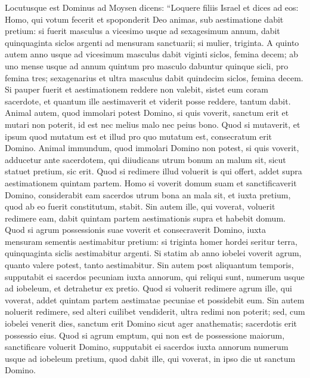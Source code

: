 \begin{biblechapter}  
\verse Locutusque est Dominus ad Moysen dicens: 
\verse “Loquere filiis Israel et dices ad eos: Homo, qui votum fecerit et spoponderit Deo animas, sub aestimatione dabit pretium: 
\verse si fuerit masculus a vicesimo usque ad sexagesimum annum, dabit quinquaginta siclos argenti ad mensuram sanctuarii;  
\verse si mulier, triginta. 
\verse A quinto autem anno usque ad vicesimum masculus dabit viginti siclos, femina decem; 
\verse ab uno mense usque ad annum quintum pro masculo dabuntur quinque sicli, pro femina tres; 
\verse sexagenarius et ultra masculus dabit quindecim siclos, femina decem. 
\verse Si pauper fuerit et aestimationem reddere non valebit, sistet eum coram sacerdote, et quantum ille aestimaverit et viderit posse reddere, tantum dabit. 
\verse Animal autem, quod immolari potest Domino, si quis voverit, sanctum erit  
\verse et mutari non poterit, id est nec melius malo nec peius bono. Quod si mutaverit, et ipsum quod mutatum est et illud pro quo mutatum est, consecratum erit Domino. 
\verse Animal immundum, quod immolari Domino non potest, si quis voverit, adducetur ante sacerdotem, 
\verse qui diiudicans utrum bonum an malum sit, sicut statuet pretium, sic erit. 
\verse Quod si redimere illud voluerit is qui offert, addet supra aestimationem quintam partem. 
\verse Homo si voverit domum suam et sanctificaverit Domino, considerabit eam sacerdos utrum bona an mala sit, et iuxta pretium, quod ab eo fuerit constitutum, stabit. 
\verse Sin autem ille, qui voverat, voluerit redimere eam, dabit quintam partem aestimationis supra et habebit domum. 
\verse Quod si agrum possessionis suae voverit et consecraverit Domino, iuxta mensuram sementis aestimabitur pretium: si triginta homer hordei seritur terra, quinquaginta siclis aestimabitur argenti. 
\verse Si statim ab anno iobelei voverit agrum, quanto valere potest, tanto aestimabitur. 
\verse Sin autem post aliquantum temporis, supputabit ei sacerdos pecuniam iuxta annorum, qui reliqui sunt, numerum usque ad iobeleum, et detrahetur ex pretio. 
\verse Quod si voluerit redimere agrum ille, qui voverat, addet quintam partem aestimatae pecuniae et possidebit eum. 
\verse Sin autem noluerit redimere, sed alteri cuilibet vendiderit, ultra redimi non poterit; 
\verse sed, cum iobelei venerit dies, sanctum erit Domino sicut ager anathematis; sacerdotis erit possessio eius. 
\verse Quod si agrum emptum, qui non est de possessione maiorum, sanctificare voluerit Domino, 
\verse supputabit ei sacerdos iuxta annorum numerum usque ad iobeleum pretium, quod dabit ille, qui voverat, in ipso die ut sanctum Domino. 

\end{biblechapter}
